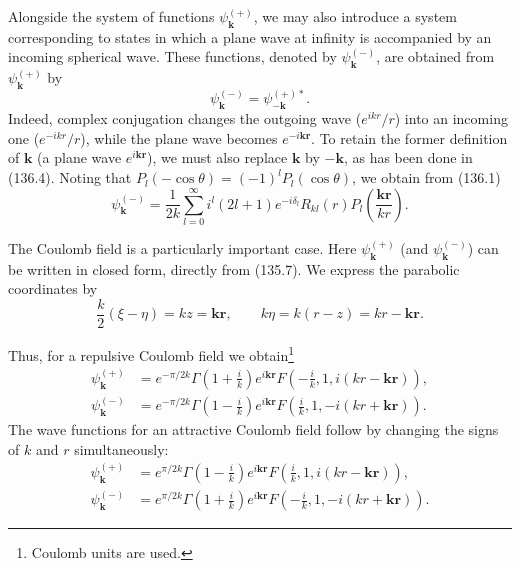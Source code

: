 Alongside the system of functions $\psi_{\mathbf k}^{(+)}$, we may also introduce a system corresponding to states in which a plane wave at infinity is accompanied by an incoming spherical wave. These functions, denoted by $\psi_{\mathbf k}^{(-)}$, are obtained from $\psi_{\mathbf k}^{(+)}$ by
\begin{equation}
 \psi_{\mathbf k}^{(-)}=\psi_{-\mathbf k}^{(+)*}.
 \tag{136.4}
\end{equation}
Indeed, complex conjugation changes the outgoing wave ($e^{ikr}/r$) into an incoming one ($e^{-ikr}/r$), while the plane wave becomes $e^{-i\mathbf{kr}}$. To retain the former definition of $\mathbf k$ (a plane wave $e^{i\mathbf{kr}}$), we must also replace $\mathbf k$ by $-\mathbf k$, as has been done in (136.4). Noting that $P_l(-\cos\theta)=(-1)^lP_l(\cos\theta)$, we obtain from (136.1)
\begin{equation}
 \psi_{\mathbf k}^{(-)}=\frac1{2k}\sum_{l=0}^{\infty}i^l(2l+1)e^{-i\delta_l}R_{kl}(r)
 P_l\left(\frac{\mathbf{kr}}{kr}\right).
 \tag{136.5}
\end{equation}

The Coulomb field is a particularly important case. Here $\psi_{\mathbf k}^{(+)}$ (and $\psi_{\mathbf k}^{(-)}$) can be written in closed form, directly from (135.7). We express the parabolic coordinates by
\[
 \frac{k}{2}(\xi-\eta)=kz=\mathbf{kr},\qquad
 k\eta=k(r-z)=kr-\mathbf{kr}.
\]

Thus, for a repulsive Coulomb field we obtain\footnote{Coulomb units are used.}
\begin{align}
 \psi_{\mathbf k}^{(+)}&=e^{-\pi/2k}\Gamma\left(1+\frac{i}{k}\right)e^{i\mathbf{kr}}
 F\left(-\frac{i}{k},1,i(kr-\mathbf{kr})\right), \tag{136.6}\\
 \psi_{\mathbf k}^{(-)}&=e^{-\pi/2k}\Gamma\left(1-\frac{i}{k}\right)e^{i\mathbf{kr}}
 F\left(\frac{i}{k},1,-i(kr+\mathbf{kr})\right). \tag{136.7}
\end{align}
The wave functions for an attractive Coulomb field follow by changing the signs of $k$ and $r$ simultaneously:
\begin{align}
 \psi_{\mathbf k}^{(+)}&=e^{\pi/2k}\Gamma\left(1-\frac{i}{k}\right)e^{i\mathbf{kr}}
 F\left(\frac{i}{k},1,i(kr-\mathbf{kr})\right), \tag{136.8}\\
 \psi_{\mathbf k}^{(-)}&=e^{\pi/2k}\Gamma\left(1+\frac{i}{k}\right)e^{i\mathbf{kr}}
 F\left(-\frac{i}{k},1,-i(kr+\mathbf{kr})\right). \tag{136.9}
\end{align}


